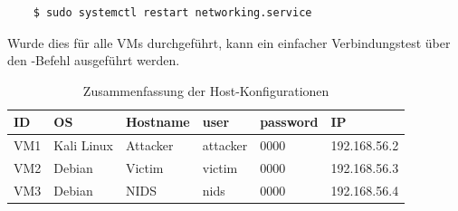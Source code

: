 \begin{verbatim}
    $ sudo systemctl restart networking.service
\end{verbatim}

Wurde dies für alle VMs durchgeführt, kann ein einfacher Verbindungstest über den -Befehl ausgeführt werden.

\begin{table}
  \centering
\begin{tabular}{|l|l|l|l|l|l|}
\hline
ID  & OS & Hostname & user & password & IP \\ \hline
VM1 & Kali Linux & Attacker & attacker & 0000 &  192.168.56.2 \\ \hline
VM2 & Debian & Victim & victim & 0000 & 192.168.56.3 \\ \hline
VM3 & Debian & NIDS & nids & 0000 &192.168.56.4 \\
\hline
\end{tabular}
\caption{Zusammenfassung der Host-Konfigurationen}\label{tab:host-config}
\end{table}

